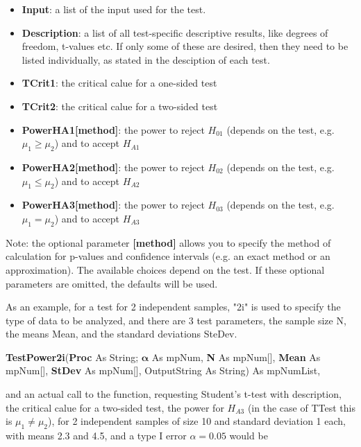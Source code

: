 \begin{itemize}
	\item \textbf{Input}: a list of the input used for the test.
	\item \textbf{Description}: a list of all test-specific descriptive results, like degrees of freedom, t-values etc. If only some of these are desired, then they need to be listed individually, as stated in the desciption of each test.
	\item \textbf{TCrit1}: the critical calue for a one-sided test
	\item \textbf{TCrit2}: the critical calue for a two-sided test
	\item \textbf{PowerHA1[method]}: the power to reject $H_{01}$ (depends on the test, e.g. $\mu_1 \geq \mu_2$) and to accept $H_{A1}$
	\item \textbf{PowerHA2[method]}: the power to reject $H_{02}$ (depends on the test, e.g. $\mu_1 \leq \mu_2$) and to accept $H_{A2}$
	\item \textbf{PowerHA3[method]}: the power to reject $H_{03}$ (depends on the test, e.g. $\mu_1 = \mu_2$) and to accept $H_{A3}$
\end{itemize}
Note: the optional parameter \textbf{[method]} allows you to specify the method of calculation for p-values and confidence intervals (e.g. an exact method or an approximation). The available choices depend on the test. If these optional parameters are omitted, the defaults will be used.

\vspace{0.3cm}
As an example, for a test for 2 independent samples, "2i" is used to specify the type of data to be analyzed,  and there are 3 test parameters, the sample size \textsf{N}, the means  \textsf{Mean}, and the standard deviations \textsf{SteDev}.

\vspace{0.3cm}
\textsf{\textbf{TestPower2i}(\textbf{Proc} As String; $\boldsymbol{\alpha}$ As mpNum,  \textbf{N} As mpNum[], \textbf{Mean} As mpNum[],  \textbf{StDev} As mpNum[], OutputString As String) As mpNumList}, 

\vspace{0.3cm}
and an actual call to the function, requesting Student's t-test with description, the critical calue for a two-sided test, the power for $H_{A3}$ (in the case of \textsf{TTest} this is $\mu_1 \neq \mu_2$), for 2 independent samples of size 10 and standard deviation 1 each, with means 2.3 and 4.5, and a type I error $\alpha=0.05$ would be

